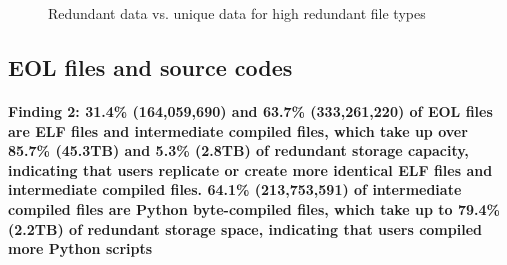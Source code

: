 \begin{figure}
	\centering
	\caption{Redundant data vs. unique data for high redundant file types}
	\label{fig:file-types}
\end{figure}

\subsection{EOL files and source codes}

\paragraph{Finding 2: 31.4\% (164,059,690) and 63.7\% (333,261,220) of EOL files are ELF files and intermediate compiled files, which take up over 85.7\% (45.3TB) and 5.3\% (2.8TB) of redundant storage capacity, indicating that users replicate or create more identical ELF files and intermediate compiled files. 64.1\% (213,753,591) of intermediate compiled files are Python byte-compiled files, which take up to 79.4\% (2.2TB) of redundant storage space, indicating that users compiled more Python scripts}

